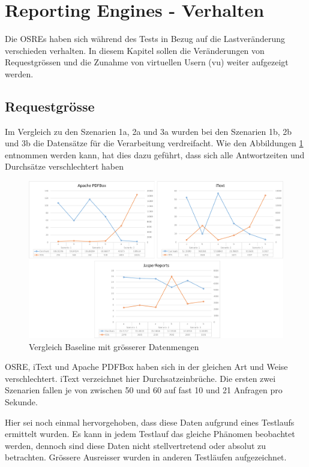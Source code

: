 \documentclass[main.tex]{subfiles}
\begin{document}
\section{Reporting Engines - Verhalten}

Die OSREs haben sich während des Tests in Bezug auf die Lastveränderung verschieden verhalten. In diesem Kapitel sollen die Veränderungen von Requestgrössen und die Zunahme von virtuellen Usern (\acrshort{vu}) weiter aufgezeigt werden.


\subsection{Requestgrösse}
Im Vergleich zu den Szenarien 1a, 2a und 3a wurden bei den Szenarien 1b, 2b und 3b die Datensätze für die Verarbeitung verdreifacht. Wie den Abbildungen \ref{figure:vglABRequ} entnommen werden kann, hat dies dazu geführt, dass sich alle Antwortzeiten und Durchsätze verschlechtert haben

\begin{figure}[!hb]
\includegraphics[width=\textwidth]{mainpart/4_analyse_img/ABAuswertung.png}
 \caption{Vergleich Baseline mit grösserer Datenmengen}
 \label{figure:vglABRequ}
\end{figure}

OSRE, iText und Apache PDFBox haben sich in der gleichen Art und Weise verschlechtert. iText verzeichnet hier Durchsatzeinbrüche. Die ersten zwei Szenarien fallen je von zwischen 50 und 60 auf fast 10 und 21 Anfragen pro Sekunde.

Hier sei noch einmal hervorgehoben, dass diese Daten aufgrund eines Testlaufs ermittelt wurden. Es kann in jedem Testlauf das gleiche Phänomen beobachtet werden, dennoch sind diese Daten nicht stellvertretend oder absolut zu betrachten. Grössere Ausreisser wurden in anderen Testläufen aufgezeichnet.
\end{document}
